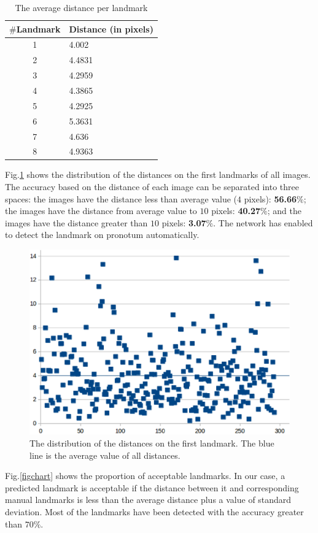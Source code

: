 \documentclass[conference]{IEEEtran}
\begin{document}
\begin{table}[htbp]
\caption{The average distance per landmark}
\begin{center}
\begin{tabular}{|c|p{1.5cm}|}
\hline
\textbf{$\#$Landmark} & \textbf{Distance} (in pixels) \\ \hline
1 & 4.002  \\ \hline
2 & 4.4831 \\ \hline
3 & 4.2959 \\ \hline
4 & 4.3865 \\ \hline
5 & 4.2925 \\ \hline
6 & 5.3631 \\ \hline
7 & 4.636 \\ \hline
8 & 4.9363 \\ \hline
\end{tabular}
\label{tab2}
\end{center}
\end{table}

Fig.\ref{figchartlm1} shows the distribution of the distances on the first landmarks of all images. The accuracy based on the distance of each image can be separated into three spaces: the images have the distance less than average value ($4$ pixels): \textbf{56.66$\%$}; the images have the distance from average value to $10$ pixels: \textbf{40.27$\%$}; and the images have the distance greater than $10$ pixels: \textbf{3.07$\%$}. The network has enabled to detect the landmark on pronotum automatically. %

\begin{figure}[htbp]
	\centerline{\includegraphics[scale=0.3]{images/statistic.eps}}
	\caption{The distribution of the distances on the first landmark. The blue line is the average value of all distances.}
	\label{figchartlm1}
\end{figure}
Fig.\ref{figchart} shows the proportion of acceptable landmarks. In our case, a predicted landmark is acceptable if the distance between it and corresponding manual landmarks is less than the average distance plus a value of standard deviation. Most of the landmarks have been detected with the accuracy greater than $70\%$. %
\end{document}
